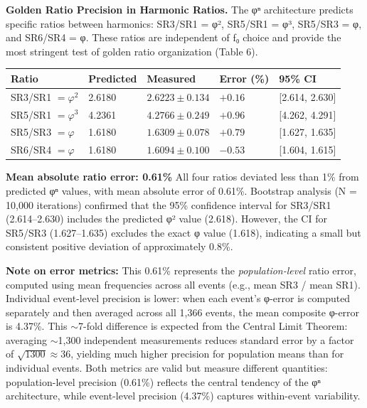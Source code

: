 \documentclass[11pt,a4paper]{article}
\begin{document}
\textbf{Golden Ratio Precision in Harmonic Ratios.}
The φⁿ architecture predicts specific ratios between harmonics: SR3/SR1 = φ², SR5/SR1 = φ³, SR5/SR3 = φ, and SR6/SR4 = φ. These ratios are independent of f₀ choice and provide the most stringent test of golden ratio organization (Table 6).
\begin{table}[H]
    \centering
    \begin{tabular}{lllll}
        \toprule
        Ratio & Predicted & Measured & Error (\%) & 95\% CI \\
        \midrule
        SR3/SR1 $= \varphi^2$ & 2.6180 & $2.6223 \pm 0.134$ & $+0.16$ & [2.614, 2.630] \\
        SR5/SR1 $= \varphi^3$ & 4.2361 & $4.2766 \pm 0.249$ & $+0.96$ & [4.262, 4.291] \\
        SR5/SR3 $= \varphi$ & 1.6180 & $1.6309 \pm 0.078$ & $+0.79$ & [1.627, 1.635] \\
        SR6/SR4 $= \varphi$ & 1.6180 & $1.6094 \pm 0.100$ & $-0.53$ & [1.604, 1.615] \\
        \bottomrule
    \end{tabular}
\end{table}
\textbf{Mean absolute ratio error: 0.61\%}
All four ratios deviated less than 1\% from predicted φⁿ values, with mean absolute error of 0.61\%. Bootstrap analysis (N = 10,000 iterations) confirmed that the 95\% confidence interval for SR3/SR1 (2.614–2.630) includes the predicted φ² value (2.618). However, the CI for SR5/SR3 (1.627–1.635) excludes the exact φ value (1.618), indicating a small but consistent positive deviation of approximately 0.8\%.

\textbf{Note on error metrics:} This 0.61\% represents the \textit{population-level} ratio error, computed using mean frequencies across all events (e.g., mean SR3 / mean SR1). Individual event-level precision is lower: when each event's φ-error is computed separately and then averaged across all 1,366 events, the mean composite φ-error is 4.37\%. This $\sim$7-fold difference is expected from the Central Limit Theorem: averaging $\sim$1,300 independent measurements reduces standard error by a factor of $\sqrt{1300} \approx 36$, yielding much higher precision for population means than for individual events. Both metrics are valid but measure different quantities: population-level precision (0.61\%) reflects the central tendency of the φⁿ architecture, while event-level precision (4.37\%) captures within-event variability.
\end{document}
